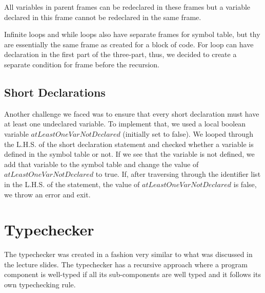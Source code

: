 \documentclass[preprint,12pt]{elsarticle}
\begin{document}
All variables in parent frames can be redeclared in these frames but a variable declared in this frame cannot be redeclared in the same frame.

Infinite loops and while loops also have separate frames for symbol table, but thy are essentially the same frame as created for a block of code. For loop can have declaration in the first part of the three-part, thus, we decided to create a separate condition for frame before the recursion.

\subsection{Short Declarations}

Another challenge we faced was to ensure that every short declaration must have at least one undeclared variable. To implement that, we used a local boolean variable $atLeastOneVarNotDeclared$ (initially set to false). We looped through the L.H.S. of the short declaration statement and checked whether a variable is defined in the symbol table or not. If we see that the variable is not defined, we add that variable to the symbol table and change the value of $atLeastOneVarNotDeclared$ to true. If, after traversing through the identifier list in the L.H.S. of the statement, the value of $atLeastOneVarNotDeclared$ is false, we throw an error and exit.

\section{Typechecker}

The typechecker was created in a fashion very similar to what was discussed in the lecture slides. The typechecker has a recursive approach where a program component is well-typed if all its sub-components are well typed and it follows its own typechecking rule.
\end{document}
